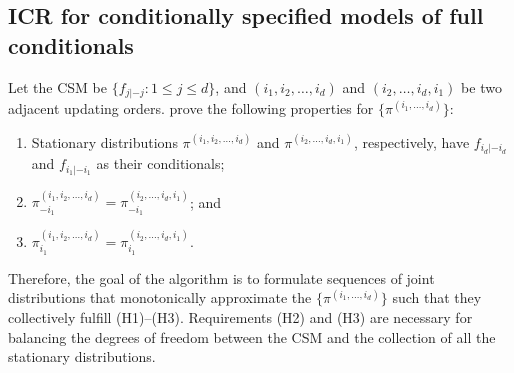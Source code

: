 \documentclass[12pt,a4paper]{article}
\begin{document}
\subsection{ICR for conditionally specified models of full conditionals}\label{sec:2-1}
Let the CSM be $\{f_{j|-j}: 1 \le j \le d\}$, and ${(i_1 ,i_2, \ldots, i_d)}$ and ${(i_2, \ldots, i_d, i_1)}$ be two adjacent updating orders.  \citet{Kuo2019} prove the following properties for $\{\pi^{(i_1,\ldots,i_d)} \}$:

\begin{enumerate}[(H1)]
\item Stationary distributions $\pi^{(i_1 ,i_2, \ldots, i_d)}$ and $\pi^{(i_2, \ldots, i_d, i_1)}$, respectively, have $f_{i_d|-i_d}$ and $f_{i_1|-i_1}$ as their conditionals;
\item $\pi^{(i_1, i_2, \ldots, i_d)}_{-i_1} = \pi^{(i_2, \ldots, i_d, i_1)}_{-i_1}$; and
\item $\pi^{(i_1, i_2, \ldots, i_d)}_{i_1} = \pi^{(i_2, \ldots, i_d, i_1)}_{i_1}$.
\end{enumerate}
Therefore, the goal of the algorithm is to formulate  sequences of joint distributions that monotonically approximate the  $\{ \pi^{(i_1, \ldots,i_d)} \}$ such that they collectively fulfill (H1)--(H3).  Requirements (H2) and (H3) are necessary for balancing the degrees of freedom between the CSM and the collection of all the stationary distributions.
\end{document}
